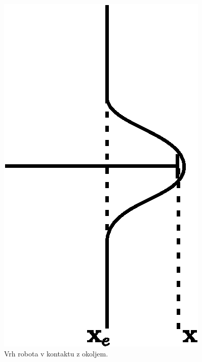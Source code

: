\begin{figure}
	\centering
	\includegraphics[scale=0.5]{./Slike/enviroment_interraction.eps}
	\caption{Vrh robota v kontaktu z okoljem.}
	\label{fig:enviroment_interraction}
\end{figure}
